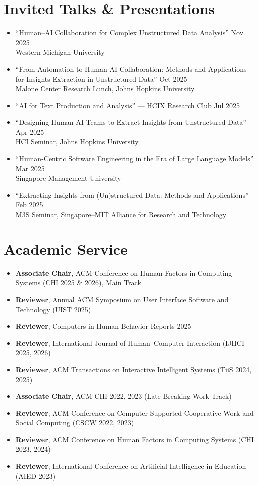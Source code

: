 \documentclass[11pt, letterpaper]{article}
\begin{document}
\section{Invited Talks \& Presentations}
\begin{itemize}[itemsep=4pt]
\item ``Human--AI Collaboration for Complex Unstructured Data Analysis'' \hfill Nov 2025 \\
Western Michigan University
\item ``From Automation to Human-AI Collaboration: Methods and Applications for Insights Extraction in Unstructured Data'' \hfill Oct 2025 \\
Malone Center Research Lunch, Johns Hopkins University
\item ``AI for Text Production and Analysis'' --- HCIX Research Club \hfill Jul 2025
\item ``Designing Human-AI Teams to Extract Insights from Unstructured Data'' \hfill Apr 2025 \\
HCI Seminar, Johns Hopkins University
\item ``Human-Centric Software Engineering in the Era of Large Language Models'' \hfill Mar 2025 \\
Singapore Management University
\item ``Extracting Insights from (Un)structured Data: Methods and Applications'' \hfill Feb 2025 \\
M3S Seminar, Singapore--MIT Alliance for Research and Technology
\end{itemize}

\section{Academic Service}
\begin{itemize}[itemsep=4pt]
\item \textbf{Associate Chair}, ACM Conference on Human Factors in Computing Systems (CHI 2025 \& 2026), Main Track
\item \textbf{Reviewer}, Annual ACM Symposium on User Interface Software and Technology (UIST 2025)
\item \textbf{Reviewer}, Computers in Human Behavior Reports 2025
\item \textbf{Reviewer}, International Journal of Human--Computer Interaction (IJHCI 2025, 2026)
\item \textbf{Reviewer}, ACM Transactions on Interactive Intelligent Systems (TiiS 2024, 2025)
\item \textbf{Associate Chair}, ACM CHI 2022, 2023 (Late-Breaking Work Track)
\item \textbf{Reviewer}, ACM Conference on Computer-Supported Cooperative Work and Social Computing (CSCW 2022, 2023)
\item \textbf{Reviewer}, ACM Conference on Human Factors in Computing Systems (CHI 2023, 2024)
\item \textbf{Reviewer}, International Conference on Artificial Intelligence in Education (AIED 2023)
\end{itemize}
\end{document}
